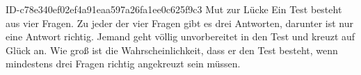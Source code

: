 \begin{exercise}
      {ID-c78e340ef02ef4a91eaa597a26fa1ee0c625f9c3}
      {Mut zur Lücke}
  \ifproblem\problem
    Ein Test besteht aus vier Fragen. Zu jeder der vier Fragen gibt es drei
    Antworten, darunter ist nur eine Antwort richtig. Jemand geht völlig
    unvorbereitet in den Test und kreuzt auf Glück an. Wie groß ist die
    Wahrscheinlichkeit, dass er den Test besteht, wenn mindestens drei Fragen
    richtig angekreuzt sein müssen.
  \fi
\end{exercise}

